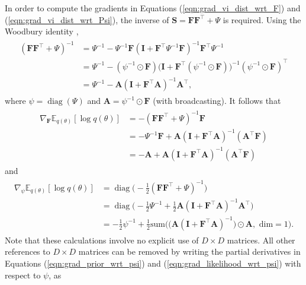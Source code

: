 \documentclass[msc,deptreport.inf]{infthesis} %
\newcommand{\matr}[1]{\mathbf{#1}}
\newcommand{\E}{\mathbb E}
\newcommand{\diag}{\mathop{\mathrm{diag}}}
\begin{document}
In order to compute the gradients in Equations (\ref{eqn:grad_vi_dist_wrt_F}) and (\ref{eqn:grad_vi_dist_wrt_Psi}), the inverse of $\matr{S} = \matr{FF}^{\intercal} + \Psi$ is required. Using the Woodbury identity \cite{petersen2012},
\begin{align}
\begin{split}
	( \matr{FF}^{\intercal} + \Psi)^{-1}
	& = \Psi^{-1} - \Psi^{-1}\matr{F}(\matr{I} + \matr{F}^\intercal \Psi^{-1} \matr{F})^{-1} \matr{F}^\intercal \Psi^{-1} \\
	& = \Psi^{-1} - (\psi^{-1} \odot \matr{F}) \big(\matr{I} + \matr{F}^\intercal (\psi^{-1} \odot \matr{F})\big)^{-1} (\psi^{-1} \odot \matr{F})^\intercal \\
	& = \Psi^{-1} - \matr{A} (\matr{I} + \matr{F}^\intercal \matr{A})^{-1} \matr{A}^\intercal,
\end{split}
\end{align}
where $\psi = \diag(\Psi)$ and $\matr{A} = \psi^{-1} \odot \matr{F}$ (with broadcasting). It follows that
\begin{align}
\begin{split}
	\nabla_\matr{F} \E_{q(\theta)} [\log q(\theta)]
	& = -( \matr{FF}^{\intercal} + \Psi)^{-1}\matr{F} \\
	& = -\Psi^{-1} \matr{F}  + \matr{A}  (\matr{I} + \matr{F}^\intercal \matr{A})^{-1} (\matr{A}^\intercal \matr{F}) \\
	& = -\matr{A}  + \matr{A} (\matr{I} + \matr{F}^\intercal \matr{A})^{-1} (\matr{A}^\intercal \matr{F})
\end{split}
\end{align}
and
\begin{align}
\begin{split}
	\nabla_\psi \E_{q(\theta)} [\log q(\theta)]
	& = \diag\Big(-\frac{1}{2} ( \matr{FF}^{\intercal} + \Psi)^{-1}\Big) \\
	& = \diag\Big(-\frac{1}{2}\Psi^{-1}  + \frac{1}{2}\matr{A}  (\matr{I} + \matr{F}^\intercal \matr{A})^{-1} \matr{A}^\intercal \Big) \\
	& = -\frac{1}{2}\psi^{-1} + \frac{1}{2} \text{sum}\Big(\big(\matr{A}  (\matr{I} + \matr{F}^\intercal \matr{A})^{-1}\big) \odot \matr{A}, \text{ dim} = 1\Big).
\end{split}
\end{align}
Note that these calculations involve no explicit use of $D \times D$ matrices. All other references to $D \times D$ matrices can be removed by writing the partial derivatives in Equations (\ref{eqn:grad_prior_wrt_psi}) and (\ref{eqn:grad_likelihood_wrt_psi}) with respect to $\psi$, as
\end{document}
